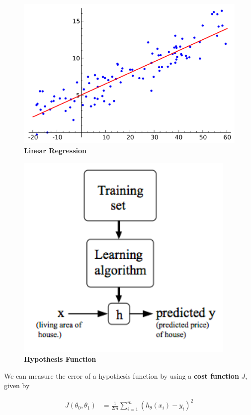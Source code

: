 \documentclass{article}
\begin{document}
        \begin{figure}[hbt!]
            \centering
            \includegraphics[scale=0.2]{Resources/Linear_Regression.png}
            \caption*{\textbf{Linear Regression}}
        \end{figure}

        \begin{figure}[hbt!]
            \centering
            \includegraphics[scale=0.75]{Resources/Hypothesis_Function.png}
            \caption*{\textbf{Hypothesis Function}}
        \end{figure}

        \noindent We can measure the error of a hypothesis function by using a \textbf{cost function} $J$,
        given by

        \begin{align*}
            J(\theta_0,\theta_1)    &= \frac{1}{2m}\sum^m_{i=1}(h_\theta(x_i)-y_i)^2
        \end{align*}
\end{document}
